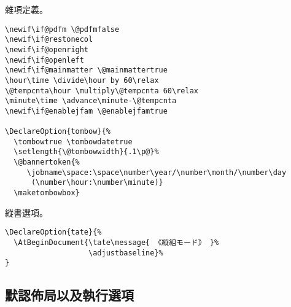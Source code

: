 \clearpage
\par 雜項定義。
\begin{lstlisting}[firstnumber=67]
\newif\if@pdfm \@pdfmfalse
\newif\if@restonecol
\newif\if@openright
\newif\if@openleft
\newif\if@mainmatter \@mainmattertrue
\hour\time \divide\hour by 60\relax
\@tempcnta\hour \multiply\@tempcnta 60\relax
\minute\time \advance\minute-\@tempcnta
\newif\if@enablejfam \@enablejfamtrue

\DeclareOption{tombow}{%
  \tombowtrue \tombowdatetrue
  \setlength{\@tombowwidth}{.1\p@}%
  \@bannertoken{%
     \jobname\space:\space\number\year/\number\month/\number\day
      (\number\hour:\number\minute)}
  \maketombowbox}
\end{lstlisting}

\par 縱書選項。
\begin{lstlisting}[firstnumber=84]
\DeclareOption{tate}{%
  \AtBeginDocument{\tate\message{ 《縦組モード》 }%
                   \adjustbaseline}%
}
\end{lstlisting}

\subsection{默認佈局以及執行選項}

